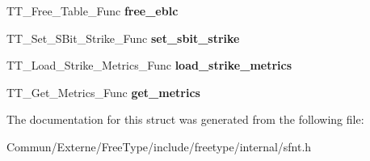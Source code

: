 \begin{DoxyCompactItemize}
\item 
T\+T\+\_\+\+Free\+\_\+\+Table\+\_\+\+Func {\bfseries free\+\_\+eblc}\hypertarget{struct_s_f_n_t___interface___a043a22a8dd45b30dc6e8e5cb7be8dc44}{}\label{struct_s_f_n_t___interface___a043a22a8dd45b30dc6e8e5cb7be8dc44}

\item 
T\+T\+\_\+\+Set\+\_\+\+S\+Bit\+\_\+\+Strike\+\_\+\+Func {\bfseries set\+\_\+sbit\+\_\+strike}\hypertarget{struct_s_f_n_t___interface___ab9e73d79753ea4a492c1cf66aee8e518}{}\label{struct_s_f_n_t___interface___ab9e73d79753ea4a492c1cf66aee8e518}

\item 
T\+T\+\_\+\+Load\+\_\+\+Strike\+\_\+\+Metrics\+\_\+\+Func {\bfseries load\+\_\+strike\+\_\+metrics}\hypertarget{struct_s_f_n_t___interface___a285149d0d4f00f2b862e3db45205cfa0}{}\label{struct_s_f_n_t___interface___a285149d0d4f00f2b862e3db45205cfa0}

\item 
T\+T\+\_\+\+Get\+\_\+\+Metrics\+\_\+\+Func {\bfseries get\+\_\+metrics}\hypertarget{struct_s_f_n_t___interface___a32ceff5842782c1cf7d7992e40cc858e}{}\label{struct_s_f_n_t___interface___a32ceff5842782c1cf7d7992e40cc858e}

\end{DoxyCompactItemize}


The documentation for this struct was generated from the following file\+:\begin{DoxyCompactItemize}
\item 
Commun/\+Externe/\+Free\+Type/include/freetype/internal/sfnt.\+h\end{DoxyCompactItemize}
